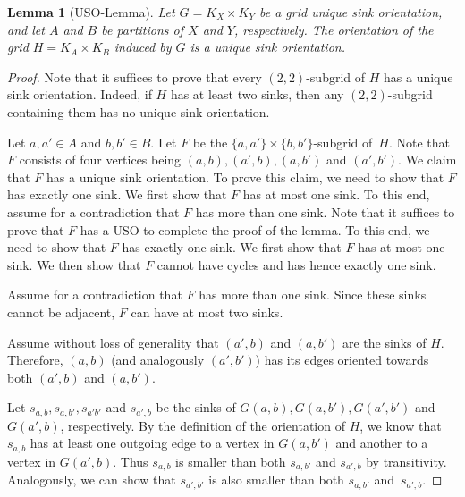 \documentclass[a4paper,10pt]{article}
\newtheorem{lemma}{Lemma}
\begin{document}
\begin{lemma}[USO-Lemma]\label{lemma:USO-Lemma}
Let $G = K_X \times K_Y$ be a grid unique sink orientation,
and let $A$ and $B$ be partitions of $X$ and $Y$, respectively.
The orientation of the grid $H = K_A \times K_B$ induced by $G$ is a unique sink orientation.
\end{lemma}
\begin{proof}
Note that it suffices to prove that every $(2,2)$-subgrid of $H$ has a unique sink orientation. Indeed, if $H$ has at least two sinks, then any $(2,2)$-subgrid containing them has no unique sink orientation.

Let $a, a'\in A$ and $b,b'\in B$. Let $F$ be the $\{a,a'\}\times\{b, b'\}$-subgrid of~$H$.
Note that $F$ consists of four vertices being $(a,b), (a', b), (a, b')$ and $(a', b')$.
We claim that $F$ has a unique sink orientation. 
To prove this claim, we need to show that $F$ has exactly one sink.
We first show that $F$ has at most one sink.
To this end, assume for a contradiction that $F$ has more than one sink.
Note that it suffices to prove that $F$ has a USO to complete the proof of the lemma. 
To this end, we need to show that $F$ has exactly one sink.
We first show that $F$ has at most one sink. We then show that $F$ cannot have cycles and has hence exactly one sink.

Assume for a contradiction that $F$ has more than one sink.
Since these sinks cannot be adjacent, $F$ can have at most two sinks.

Assume without loss of generality that $(a',b)$ and $(a, b')$ are the sinks of $H$.
Therefore, $(a, b)$ (and analogously $(a', b')$) has its edges oriented towards both $(a',b)$ and $(a, b')$.

Let $s_{a,b}, s_{a, b'}, s_{a'b'}$ and $s_{a', b}$ be the sinks of $G(a,b), G(a,b'), G(a',b')$ and $G(a',b)$, respectively.
By the definition of the orientation of $H$, we know that $s_{a,b}$ has at least one outgoing edge to a vertex in $G(a, b')$ and another to a vertex in $G(a', b)$. Thus $s_{a,b}$ is smaller than both $s_{a,b'}$ and $s_{a',b}$ by transitivity. Analogously, we can show that $s_{a',b'}$ is also smaller than both $s_{a,b'}$ and~$s_{a',b}$. 


\end{proof}
\end{document}
